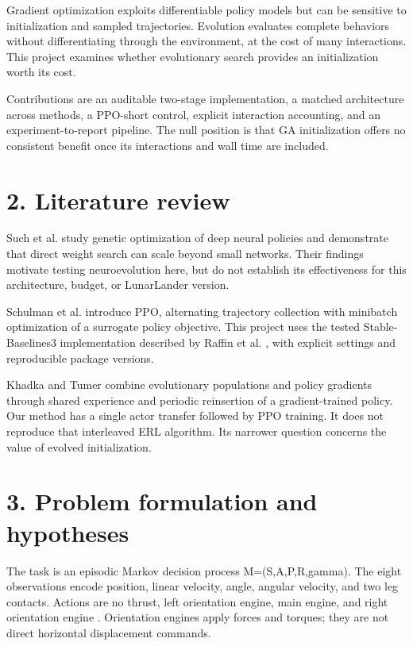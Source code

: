 \documentclass[11pt,a4paper]{article}
\begin{document}
Gradient optimization exploits differentiable policy models but can be sensitive to initialization and sampled trajectories. Evolution evaluates complete behaviors without differentiating through the environment, at the cost of many interactions. This project examines whether evolutionary search provides an initialization worth its cost.

Contributions are an auditable two-stage implementation, a matched architecture across methods, a PPO-short control, explicit interaction accounting, and an experiment-to-report pipeline. The null position is that GA initialization offers no consistent benefit once its interactions and wall time are included.

\section*{2. Literature review}
Such et al. \cite{such2017deep} study genetic optimization of deep neural policies and demonstrate that direct weight search can scale beyond small networks. Their findings motivate testing neuroevolution here, but do not establish its effectiveness for this architecture, budget, or LunarLander version.

Schulman et al. \cite{schulman2017ppo} introduce PPO, alternating trajectory collection with minibatch optimization of a surrogate policy objective. This project uses the tested Stable-Baselines3 implementation described by Raffin et al. \cite{raffin2021sb3}, with explicit settings and reproducible package versions.

Khadka and Tumer \cite{khadka2018erl} combine evolutionary populations and policy gradients through shared experience and periodic reinsertion of a gradient-trained policy. Our method has a single actor transfer followed by PPO training. It does not reproduce that interleaved ERL algorithm. Its narrower question concerns the value of evolved initialization.

\section*{3. Problem formulation and hypotheses}
The task is an episodic Markov decision process M=(S,A,P,R,gamma). The eight observations encode position, linear velocity, angle, angular velocity, and two leg contacts. Actions are no thrust, left orientation engine, main engine, and right orientation engine \cite{gymnasiumlander}. Orientation engines apply forces and torques; they are not direct horizontal displacement commands.
\end{document}
